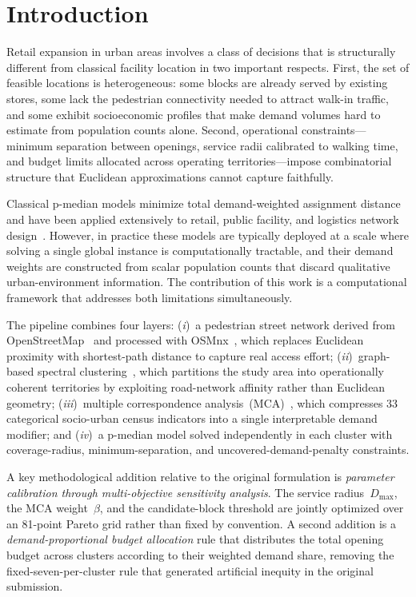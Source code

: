 \section{Introduction}
\label{sec:intro}

Retail expansion in urban areas involves a class of decisions that is structurally
different from classical facility location in two important respects.
First, the set of feasible locations is heterogeneous: some blocks are already
served by existing stores, some lack the pedestrian connectivity needed to
attract walk-in traffic, and some exhibit socioeconomic profiles that make
demand volumes hard to estimate from population counts alone.
Second, operational constraints—minimum separation between openings,
service radii calibrated to walking time, and budget limits allocated
across operating territories—impose combinatorial structure that Euclidean
approximations cannot capture faithfully.

Classical \mbox{p-median} models minimize total demand-weighted assignment
distance~\cite{hakimi1964optimum} and have been applied extensively to
retail, public facility, and logistics network design~\cite{daskin1995network,%
tadic2023locating}.
However, in practice these models are typically deployed at a scale where
solving a single global instance is computationally tractable, and their
demand weights are constructed from scalar population counts that discard
qualitative urban-environment information.
The contribution of this work is a computational framework that addresses
both limitations simultaneously.

The pipeline combines four layers:
(\textit{i})~a pedestrian street network derived from
OpenStreetMap~\cite{osm2025} and processed with OSMnx~\cite{boeing2017osmnx},
which replaces Euclidean proximity with shortest-path distance to
capture real access effort;
(\textit{ii})~graph-based spectral clustering~\cite{ng2002spectral,%
vonluxburg2007tutorial}, which partitions the study area into operationally
coherent territories by exploiting road-network affinity rather than
Euclidean geometry;
(\textit{iii})~multiple correspondence analysis~(MCA)~\cite{greenacre2017correspondence},
which compresses 33 categorical socio-urban census indicators into a single
interpretable demand modifier; and
(\textit{iv})~a \mbox{p-median} model solved independently in each cluster
with coverage-radius, minimum-separation, and uncovered-demand-penalty
constraints.

A key methodological addition relative to the original formulation is
\textit{parameter calibration through multi-objective sensitivity analysis}.
The service radius~$D_{\max}$, the MCA weight~$\beta$, and the candidate-block
threshold are jointly optimized over an 81-point Pareto grid rather than
fixed by convention.
A second addition is a \textit{demand-proportional budget allocation} rule that
distributes the total opening budget across clusters according to their
weighted demand share, removing the fixed-seven-per-cluster rule that generated
artificial inequity in the original submission.

